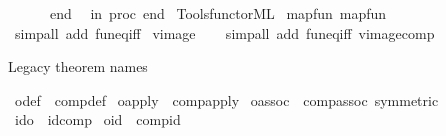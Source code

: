 \begin{isabellebody}
\ \ \ \ \ \ end\isanewline
\ \ in\ proc\ end\isanewline
{\isacartoucheclose}%
\endisatagML
{\isafoldML}%
%
\isadelimML
%
\endisadelimML
%
\isadelimdocument
%
\endisadelimdocument
%
\isatagdocument
%
\isamarkuptrue%
%
\endisatagdocument
{\isafolddocument}%
%
\isadelimdocument
%
\endisadelimdocument
%
\isadelimML
%
\endisadelimML
%
\isatagML
{}\isamarkupfalse%
\ {\isacartoucheopen}Tools{\isacharslash}{\kern0pt}functor{\isachardot}{\kern0pt}ML{\isacartoucheclose}%
\endisatagML
{\isafoldML}%
%
\isadelimML
%
\endisadelimML
\isanewline
\isanewline
{}\isamarkupfalse%
\ map{\isacharunderscore}{\kern0pt}fun{\isacharcolon}{\kern0pt}\ map{\isacharunderscore}{\kern0pt}fun\isanewline
%
\isadelimproof
\ \ %
\endisadelimproof
%
\isatagproof
{}\isamarkupfalse%
\ {\isacharparenleft}{\kern0pt}simp{\isacharunderscore}{\kern0pt}all\ add{\isacharcolon}{\kern0pt}\ fun{\isacharunderscore}{\kern0pt}eq{\isacharunderscore}{\kern0pt}iff{\isacharparenright}{\kern0pt}%
\endisatagproof
{\isafoldproof}%
%
\isadelimproof
\isanewline
%
\endisadelimproof
\isanewline
{}\isamarkupfalse%
\ vimage\isanewline
%
\isadelimproof
\ \ %
\endisadelimproof
%
\isatagproof
{}\isamarkupfalse%
\ {\isacharparenleft}{\kern0pt}simp{\isacharunderscore}{\kern0pt}all\ add{\isacharcolon}{\kern0pt}\ fun{\isacharunderscore}{\kern0pt}eq{\isacharunderscore}{\kern0pt}iff\ vimage{\isacharunderscore}{\kern0pt}comp{\isacharparenright}{\kern0pt}%
\endisatagproof
{\isafoldproof}%
%
\isadelimproof
%
\endisadelimproof
%
\begin{isamarkuptext}%
Legacy theorem names%
\end{isamarkuptext}\isamarkuptrue%
\isamarkupfalse%
\ o{\isacharunderscore}{\kern0pt}def\ {\isacharequal}{\kern0pt}\ comp{\isacharunderscore}{\kern0pt}def\isanewline
{}\isamarkupfalse%
\ o{\isacharunderscore}{\kern0pt}apply\ {\isacharequal}{\kern0pt}\ comp{\isacharunderscore}{\kern0pt}apply\isanewline
{}\isamarkupfalse%
\ o{\isacharunderscore}{\kern0pt}assoc\ {\isacharequal}{\kern0pt}\ comp{\isacharunderscore}{\kern0pt}assoc\ {\isacharbrackleft}{\kern0pt}symmetric{\isacharbrackright}{\kern0pt}\isanewline
{}\isamarkupfalse%
\ id{\isacharunderscore}{\kern0pt}o\ {\isacharequal}{\kern0pt}\ id{\isacharunderscore}{\kern0pt}comp\isanewline
{}\isamarkupfalse%
\ o{\isacharunderscore}{\kern0pt}id\ {\isacharequal}{\kern0pt}\ comp{\isacharunderscore}{\kern0pt}id\isanewline

\end{isabellebody}
